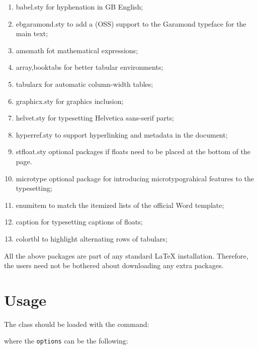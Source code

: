 \documentclass[10pt]{imeko_acta}
\def\file#1{\textsf{\fontsize{9.1}{9.5}\selectfont#1}\xspace}
\begin{document}
\begin{enumerate}
	\item \file{babel.sty} for hyphenation in GB English;
	\item \file{ebgaramond.sty} to add a (OSS) support to the Garamond typeface for the main text;
	\item \file{amsmath} fot mathematical expressions;
	\item \file{array,booktabs} for better tabular environments;
	\item \file{tabularx} for automatic column-width tables;
	\item \file{graphicx.sty} for graphics inclusion;
	\item \file{helvet.sty} for typesetting Helvetica sans-serif parts;
	\item \file{hyperref.sty} to support hyperlinking and metadata in the document;
	\item \file{stfloat.sty} optional packages if floats need to be placed at
	the bottom of the page.
	\item \file{microtype} optional package for introducing microtypograhical features to the typesetting;
	\item \file{enumitem} to match the itemized lists of the official Word template;
	\item \file{caption} for typesetting captions of floats;
	\item \file{colortbl} to highlight alternating rows of tabulars;
\end{enumerate}

All the above packages are part of any
standard \LaTeX{} installation. Therefore, the users need not be
bothered about downloading any extra packages.

\section{Usage}\label{sec:usage}
The class should be loaded with the command:
\medskip


\medskip\noindent where the \verb+options+ can be the following:
\end{document}
